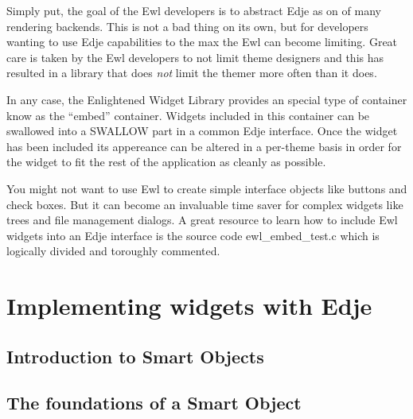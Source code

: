 \documentclass[12pt,a4paper,english]{book}
\begin{document}
Simply put, the goal of the Ewl developers is to abstract Edje as on of many
rendering backends. This is not a bad thing on its own, but for developers
wanting to use Edje capabilities to the max the Ewl can become limiting. Great
care is taken by the Ewl developers to not limit theme designers and this has
resulted in a library that does \emph{not} limit the themer more often than it does.

In any case, the Enlightened Widget Library provides an special type of
container know as the ``embed'' container. Widgets included in this container can
be swallowed into a SWALLOW part in a common Edje interface. Once the widget
has been included its appereance can be altered in a per-theme basis in order
for the widget to fit the rest of the application as cleanly as possible.

You might not want to use Ewl to create simple interface objects like buttons
and check boxes. But it can become an invaluable time saver for complex widgets
like trees and file management dialogs. A great resource to learn how to
include Ewl widgets into an Edje interface is the source code ewl{\_}embed{\_}test.c
which is logically divided and toroughly commented.



\hypertarget{implementing-widgets-with-edje}{}
\section{Implementing widgets with Edje}
\label{implementing-widgets-with-edje}



\hypertarget{introduction-to-smart-objects}{}
\subsection{Introduction to Smart Objects}
\label{introduction-to-smart-objects}



\hypertarget{the-foundations-of-a-smart-object}{}
\subsection{The foundations of a Smart Object}
\label{the-foundations-of-a-smart-object}
\end{document}

